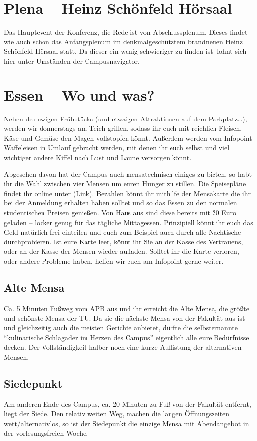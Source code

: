 \section*{Plena -- Heinz Schönfeld Hörsaal}
Das Hauptevent der Konferenz, die Rede ist von Abschlussplenum.
Dieses findet wie auch schon das Anfangsplenum im denkmalgeschütztem brandneuen Heinz Schönfeld Hörsaal statt.
Da dieser ein wenig schwieriger zu finden ist, lohnt sich hier unter Umständen der Campusnavigator.

\section*{Essen -- Wo und was?}
Neben des ewigen Frühstücks (und etwaigen Attraktionen auf dem Parkplatz…), werden wir donnerstags am Teich grillen, sodass ihr euch mit reichlich Fleisch, Käse und Gemüse den Magen vollstopfen könnt.
Außerdem werden vom Infopoint Waffeleisen in Umlauf gebracht werden, mit denen ihr euch selbst und viel wichtiger andere Kiffel nach Lust und Laune versorgen könnt.

Abgesehen davon hat der Campus auch mensatechnisch einiges zu bieten, so habt ihr die Wahl zwischen vier Mensen um euren Hunger zu stillen.
Die Speisepläne findet ihr online unter (Link).
Bezahlen könnt ihr mithilfe der Mensakarte die ihr bei der Anmeldung erhalten haben solltet und so das Essen zu den normalen studentischen Preisen genießen.
Von Haus aus sind diese bereits mit 20 Euro geladen -- locker genug für das tägliche Mittagessen.
Prinzipiell könnt ihr euch das Geld natürlich frei einteilen und euch zum Beispiel auch durch alle Nachtische durchprobieren.
Ist eure Karte leer, könnt ihr Sie an der Kasse des Vertrauens, oder an der Kasse der Mensen wieder aufladen.
Solltet ihr die Karte verloren, oder andere Probleme haben, helfen wir euch am Infopoint gerne weiter.

\subsection*{Alte Mensa}
Ca. 5 Minuten Fußweg vom APB aus und ihr erreicht die Alte Mensa, die größte und schönste Mensa der TU\@.
Da sie die nächste Mensa von der Fakultät aus ist und gleichzeitig auch die meisten Gerichte anbietet, dürfte die selbsternannte \enquote{kulinarische Schlagader im Herzen des Campus} eigentlich alle eure Bedürfnisse decken.
Der Vollständigkeit halber noch eine kurze Auflistung der alternativen Mensen.

\subsection*{Siedepunkt}
Am anderen Ende des Campus, ca. 20 Minuten zu Fuß von der Fakultät entfernt, liegt der Siede.
Den relativ weiten Weg, machen die langen Öffnungszeiten wett/alternativlos, so ist der Siedepunkt die einzige Mensa mit Abendangebot in der vorlesungsfreien Woche.

